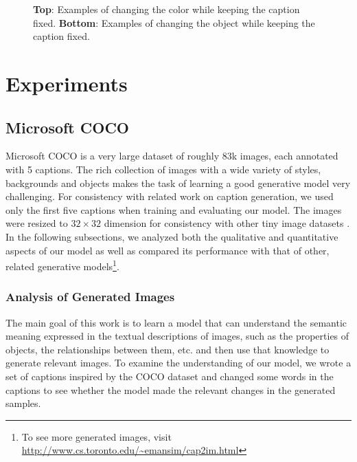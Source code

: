 \documentclass{article} %
\begin{document}
\begin{figure}[!t]
\begin{center}
\quad
%
\quad
%
\end{center}
\caption{\small
 \textbf{Top}: Examples of changing the color while keeping the caption fixed.
 \textbf{Bottom}: Examples of changing the object while keeping the caption fixed. }
\label{fig:genimages3}
\vspace{-0.1in}
\end{figure}

\section{Experiments}
\vspace{-0.05in}
\subsection{Microsoft COCO}
\vspace{-0.05in}
Microsoft COCO \citep{mscoco} is a very large dataset of roughly 83k images, each annotated with 5 captions. The rich collection of images with a wide variety of styles, backgrounds and objects makes the task of learning a good generative model 
very challenging. For consistency with related work on caption generation, we used only the first five captions when training and evaluating our model. 
The images were resized to $32 \times 32$ dimension for consistency with other tiny image datasets \citep{krizhevsky_cifar}. In the following subsections, we analyzed both the qualitative and quantitative aspects of our model as well as compared its performance with that of other, related generative models\footnote{To see more
generated images, visit \url{http://www.cs.toronto.edu/~emansim/cap2im.html}}.

\subsubsection{Analysis of Generated Images}
\vspace{-0.05in}
The main goal of this work is to learn a model that can understand the semantic meaning expressed in the textual descriptions of images, such as the properties of objects, the relationships between them, etc. and then use that knowledge to generate relevant images. To examine the understanding of our model, we wrote a set of captions inspired by the COCO dataset and changed some words in the captions to see whether the model made the relevant changes in the generated samples.
\end{document}
